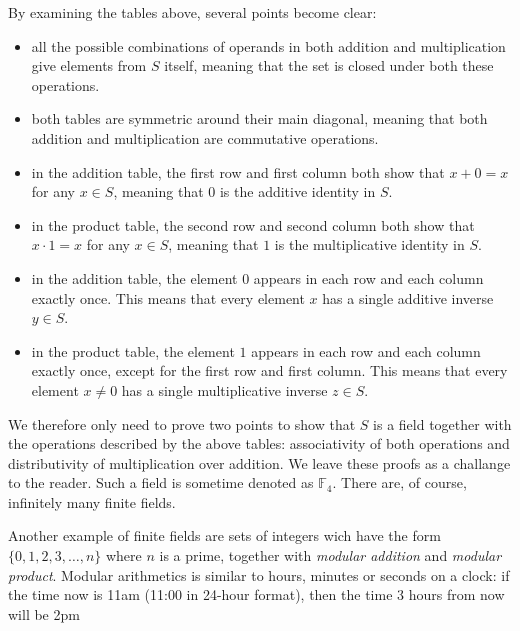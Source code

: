 \flushleft
By examining the tables above, several points become clear:
\begin{itemize}
	\item all the possible combinations of operands in both addition and multiplication give elements from $S$ itself, meaning that the set is closed under both these operations.
	\item both tables are symmetric around their main diagonal, meaning that both addition and multiplication are commutative operations.
	\item in the addition table, the first row and first column both show that $x+0=x$ for any $x\in S$, meaning that $0$ is the additive identity in $S$.
	\item in the product table, the second row and second column both show that $x\cdot1=x$ for any $x\in S$, meaning that $1$ is the multiplicative identity in $S$.
	\item in the addition table, the element $0$ appears in each row and each column exactly once. This means that every element $x$ has a single additive inverse $y\in S$.
	\item in the product table, the element $1$ appears in each row and each column exactly once, except for the first row and first column. This means that every element $x\neq 0$ has a single multiplicative inverse $z\in S$.
\end{itemize}

We therefore only need to prove two points to show that $S$ is a field together with the operations described by the above tables: associativity of both operations and distributivity of multiplication over addition. We leave these proofs as a challange to the reader. Such a field is sometime denoted as $\mathbb{F}_{4}$. There are, of course, infinitely many finite fields.

Another example of finite fields are sets of integers wich have the form $\{0,1,2,3,\dots,n\}$ where $n$ is a prime, together with \emph{modular addition} and \emph{modular product}. Modular arithmetics is similar to hours, minutes or seconds on a clock: if the time now is 11am (11:00 in 24-hour format), then the time 3 hours from now will be 2pm
